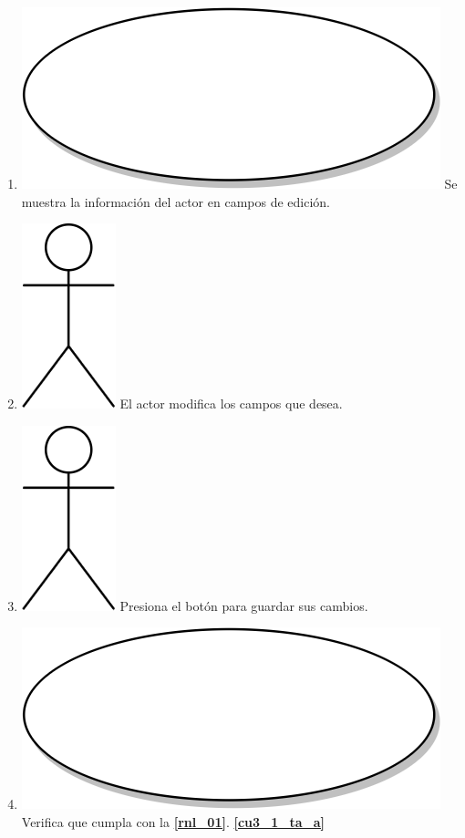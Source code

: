 \begin{enumerate}
\item {\includegraphics[scale=.05]{Capitulo3/img/proceso.png} Se muestra la información del actor en campos de edición.}
\item {\includegraphics[scale=.1]{Capitulo3/img/actor.png} El actor modifica los campos que desea.}
  \item {\includegraphics[scale=.1]{Capitulo3/img/actor.png} Presiona el botón para guardar sus cambios.}
  \item {\includegraphics[scale=.05]{Capitulo3/img/proceso.png} Verifica que cumpla con la \textbf{\ref{rnl_01}}. \textbf{\ref{cu3_1_ta_a}}}

\end{enumerate}
